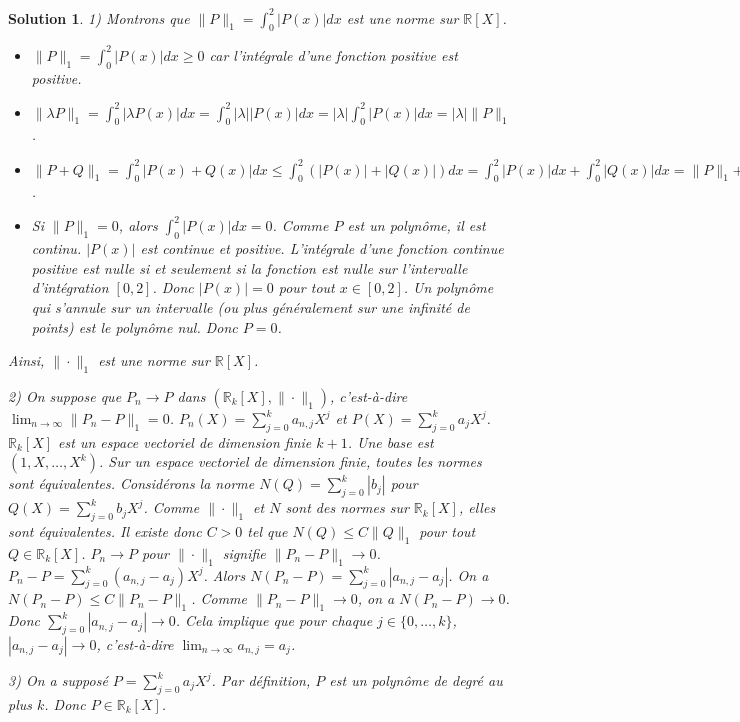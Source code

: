 \documentclass{article}
\newtheorem{solution}{Solution}
\begin{document}
\begin{solution}
1) Montrons que $\|P\|_1 = \int_0^2 |P(x)| dx$ est une norme sur $\mathbb{R}[X]$.
\begin{itemize}
    \item $\|P\|_1 = \int_0^2 |P(x)| dx \ge 0$ car l'intégrale d'une fonction positive est positive.
    \item $\|\lambda P\|_1 = \int_0^2 |\lambda P(x)| dx = \int_0^2 |\lambda| |P(x)| dx = |\lambda| \int_0^2 |P(x)| dx = |\lambda| \|P\|_1$.
    \item $\|P+Q\|_1 = \int_0^2 |P(x)+Q(x)| dx \le \int_0^2 (|P(x)|+|Q(x)|) dx = \int_0^2 |P(x)| dx + \int_0^2 |Q(x)| dx = \|P\|_1 + \|Q\|_1$.
    \item Si $\|P\|_1 = 0$, alors $\int_0^2 |P(x)| dx = 0$. Comme $P$ est un polynôme, il est continu. $|P(x)|$ est continue et positive. L'intégrale d'une fonction continue positive est nulle si et seulement si la fonction est nulle sur l'intervalle d'intégration $[0,2]$. Donc $|P(x)| = 0$ pour tout $x \in [0,2]$.
    Un polynôme qui s'annule sur un intervalle (ou plus généralement sur une infinité de points) est le polynôme nul. Donc $P = 0$.
\end{itemize}
Ainsi, $\| \cdot \|_1$ est une norme sur $\mathbb{R}[X]$.

2) On suppose que $P_n \to P$ dans $(\mathbb{R}_k[X], \| \cdot \|_1)$, c'est-à-dire $\lim_{n \to \infty} \|P_n - P\|_1 = 0$.
$P_n(X) = \sum_{j=0}^k a_{n,j} X^j$ et $P(X) = \sum_{j=0}^k a_j X^j$.
$\mathbb{R}_k[X]$ est un espace vectoriel de dimension finie $k+1$. Une base est $(1, X, \dots, X^k)$.
Sur un espace vectoriel de dimension finie, toutes les normes sont équivalentes.
Considérons la norme $N(Q) = \sum_{j=0}^k |b_j|$ pour $Q(X) = \sum_{j=0}^k b_j X^j$.
Comme $\| \cdot \|_1$ et $N$ sont des normes sur $\mathbb{R}_k[X]$, elles sont équivalentes.
Il existe donc $C > 0$ tel que $N(Q) \le C \|Q\|_1$ pour tout $Q \in \mathbb{R}_k[X]$.
$P_n \to P$ pour $\| \cdot \|_1$ signifie $\|P_n - P\|_1 \to 0$.
$P_n - P = \sum_{j=0}^k (a_{n,j} - a_j) X^j$.
Alors $N(P_n - P) = \sum_{j=0}^k |a_{n,j} - a_j|$.
On a $N(P_n - P) \le C \|P_n - P\|_1$.
Comme $\|P_n - P\|_1 \to 0$, on a $N(P_n - P) \to 0$.
Donc $\sum_{j=0}^k |a_{n,j} - a_j| \to 0$.
Cela implique que pour chaque $j \in \{0, \dots, k\}$, $|a_{n,j} - a_j| \to 0$, c'est-à-dire $\lim_{n \to \infty} a_{n,j} = a_j$.

3) On a supposé $P = \sum_{j=0}^k a_j X^j$. Par définition, $P$ est un polynôme de degré au plus $k$. Donc $P \in \mathbb{R}_k[X]$.


\end{solution}
\end{document}

